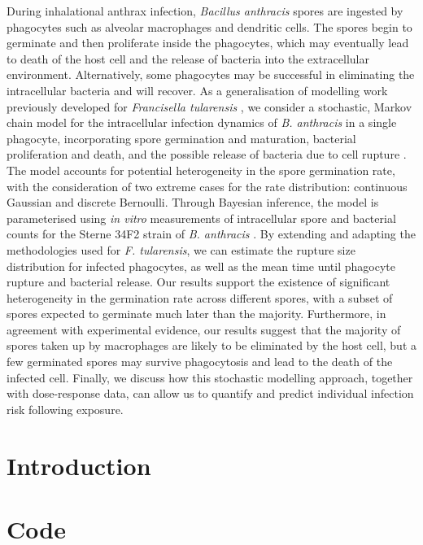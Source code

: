 \documentclass[11pt,a4paper]{article}
\begin{document}
During inhalational anthrax infection, \textit{Bacillus anthracis} spores are ingested by phagocytes such as alveolar macrophages and dendritic cells. The spores begin to germinate and then proliferate inside the phagocytes, which may eventually lead to death of the host cell and the release of bacteria into the extracellular environment. Alternatively, some phagocytes may be successful in eliminating the intracellular bacteria and will recover. As a generalisation of modelling work previously developed for \textit{Francisella tularensis} \cite{carruthers}, we consider a stochastic, Markov chain model for the intracellular infection dynamics of \textit{B. anthracis} in a single phagocyte, incorporating spore germination and maturation, bacterial proliferation and death, and the possible release of bacteria due to cell rupture \cite{williams}. The model accounts for potential heterogeneity in the spore germination rate, with the consideration of two extreme cases for the rate distribution: continuous Gaussian and discrete Bernoulli. Through Bayesian inference, the model is parameterised using \textit{in vitro} measurements of intracellular spore and bacterial counts for the Sterne 34F2 strain of \textit{B. anthracis} \cite{kang, pantha}. By extending and adapting the methodologies used for \textit{F. tularensis}, we can estimate the rupture size distribution for infected phagocytes, as well as the mean time until phagocyte rupture and bacterial release. Our results support the existence of significant heterogeneity in the germination rate across different spores, with a subset of spores expected to germinate much later than the majority. Furthermore, in agreement with experimental evidence, our results suggest that the majority of spores taken up by macrophages are likely to be eliminated by the host cell, but a few germinated spores may survive phagocytosis and lead to the death of the infected cell. Finally, we discuss how this stochastic modelling approach, together with dose-response data, can allow us to quantify and predict individual infection risk following exposure.

\section{Introduction}

\section{Code}
 
\end{document}
